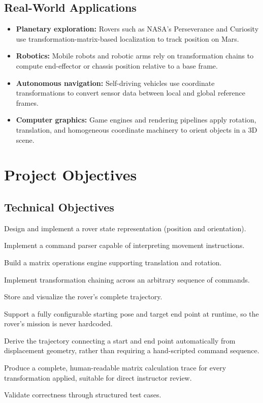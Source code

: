 \documentclass[12pt]{report}
\begin{document}
\section{Real-World Applications}
\begin{itemize}
\item \textbf{Planetary exploration:} Rovers such as NASA's Perseverance and Curiosity use transformation-matrix-based localization to track position on Mars.
\item \textbf{Robotics:} Mobile robots and robotic arms rely on transformation chains to compute end-effector or chassis position relative to a base frame.
\item \textbf{Autonomous navigation:} Self-driving vehicles use coordinate transformations to convert sensor data between local and global reference frames.
\item \textbf{Computer graphics:} Game engines and rendering pipelines apply rotation, translation, and homogeneous coordinate machinery to orient objects in a 3D scene.
\end{itemize}

\chapter{Project Objectives}

\section{Technical Objectives}
\begin{checklist}
\item Design and implement a rover state representation (position and orientation).
\item Implement a command parser capable of interpreting movement instructions.
\item Build a matrix operations engine supporting translation and rotation.
\item Implement transformation chaining across an arbitrary sequence of commands.
\item Store and visualize the rover's complete trajectory.
\item Support a fully configurable starting pose and target end point at runtime, so the rover's mission is never hardcoded.
\item Derive the trajectory connecting a start and end point automatically from displacement geometry, rather than requiring a hand-scripted command sequence.
\item Produce a complete, human-readable matrix calculation trace for every transformation applied, suitable for direct instructor review.
\item Validate correctness through structured test cases.
\end{checklist}
\end{document}
